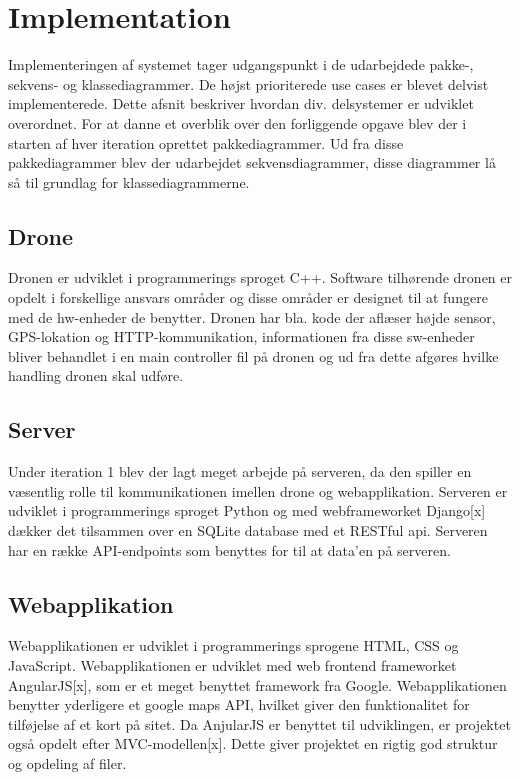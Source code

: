 \chapter{Implementation}
Implementeringen af systemet tager udgangspunkt i de udarbejdede pakke-, sekvens- og klassediagrammer. De højst prioriterede use cases er blevet delvist implementerede. Dette afsnit beskriver hvordan div. delsystemer er udviklet overordnet.
For at danne et overblik over den forliggende opgave blev der i starten af hver iteration oprettet pakkediagrammer. Ud fra disse pakkediagrammer blev der udarbejdet sekvensdiagrammer, disse diagrammer lå så til grundlag for klassediagrammerne.

\section{Drone}
Dronen er udviklet i programmerings sproget C++. Software tilhørende dronen er opdelt i forskellige ansvars områder og disse områder er designet til at fungere med de hw-enheder de benytter. Dronen har bla. kode der aflæser højde sensor, GPS-lokation og HTTP-kommunikation, informationen fra disse sw-enheder bliver behandlet i en main controller fil på dronen og ud fra dette afgøres hvilke handling dronen skal udføre.

\section{Server}
Under iteration 1 blev der lagt meget arbejde på serveren, da den spiller en væsentlig rolle til kommunikationen imellen drone og webapplikation. Serveren er udviklet i programmerings sproget Python og med webframeworket Django[x] dækker det tilsammen over en SQLite database med et RESTful api. Serveren har en række API-endpoints som benyttes for til at data'en på serveren.

\section{Webapplikation}
Webapplikationen  er udviklet i programmerings sprogene HTML, CSS og JavaScript. Webapplikationen er udviklet med web frontend frameworket AngularJS[x], som er et meget benyttet framework fra Google. Webapplikationen benytter yderligere et google maps API, hvilket giver den funktionalitet for tilføjelse af et kort på sitet. 
Da AnjularJS er benyttet til udviklingen, er projektet også opdelt efter MVC-modellen[x]. Dette giver projektet en rigtig god struktur og opdeling af filer.